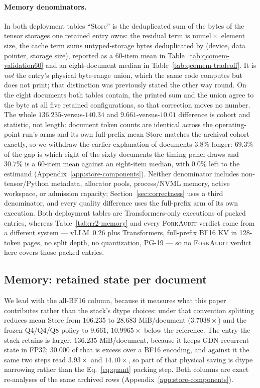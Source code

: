 \documentclass{article}
\newcommand{\method}{\textsc{ForkAudit}}
\begin{document}
\paragraph{Memory denominators.}
\label{sec:denominators}
In both deployment tables ``Store'' is the deduplicated sum of the bytes of the
tensor storages one retained entry owns: the residual term is
$\mathrm{numel}\times$ element size, the cache term sums untyped-storage bytes
deduplicated by (device, data pointer, storage size), reported as a 60-item mean
in Table~\ref{tab:qcomem-validation60} and an eight-document median in
Table~\ref{tab:qcomem-tradeoff}.  It is \emph{not} the entry's physical
byte-range union, which the same code computes but does not print; that
distinction was previously stated the other way round.  On the eight documents
both tables contain, the printed sum and the union agree to the byte at all five
retained configurations, so that correction moves no number.
The whole $136.235$-versus-$140.34$ and $9.661$-versus-$10.01$ difference is
cohort and statistic, not length: document token counts are identical across the
operating-point run's arms and its own full-prefix mean Store matches the
archival cohort exactly, so we withdraw the earlier explanation of documents
$3.8\%$ longer: $69.3\%$ of the gap is which eight of the sixty documents the
timing panel draws and $30.7\%$ is a 60-item mean against an eight-item median,
with $0.0\%$ left to the estimand (Appendix~\ref{app:store-components}).  Neither denominator includes
non-tensor/Python metadata, allocator pools, process/NVML memory, active
workspace, or admission capacity; Section~\ref{sec:correctness} uses a third
denominator, and every quality difference uses the full-prefix arm of its own
execution.
Both deployment tables are Transformers-only executions of packed entries,
whereas Table~\ref{tab:rr2-memory} and every \method{} verdict come from a
different system --- vLLM~0.26 plus Transformers, full-prefix BF16 KV in
128-token pages, no split depth, no quantization, PG-19 --- so no \method{}
verdict here covers those packed entries.

\subsection{Memory: retained state per document}
\label{sec:memory}

We lead with the all-BF16 column, because it measures what this paper contributes
rather than the stack's dtype choices: under that convention splitting reduces
mean Store from $106.235$ to $28.683$ MiB/document ($3.7038\times$) and the frozen
Q4/Q4/Q8 policy to $9.661$, $10.9965\times$ below the reference.  The entry the
stack retains is larger, $136.235$ MiB/document, because it keeps GDN recurrent
state in FP32; $30.000$ of that is excess over a BF16 encoding, and against it
the same two steps read $3.93\times$ and $14.10\times$, so part of that physical
saving is dtype narrowing rather than the Eq.~\ref{eq:quant} packing step.  Both
columns are exact re-analyses of the same archived rows
(Appendix~\ref{app:store-components}).
\end{document}
